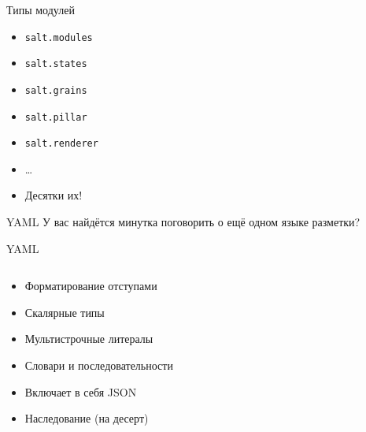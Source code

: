 \begin{Frame}{Типы модулей}
  \begin{itemize}[<+-| alert@ +>]
    \item \texttt{salt.modules}
    \item \texttt{salt.states}
    \item \texttt{salt.grains}
    \item \texttt{salt.pillar}
    \item \texttt{salt.renderer}
    \item \ldots
    \item Десятки их!
  \end{itemize}
\end{Frame}

\begin{Frame}{YAML}
  \centering
  \huge У вас найдётся минутка поговорить о ещё одном языке разметки?
\end{Frame}

\begin{frame}{YAML}
  \ExampleNote{}

  \begin{columns}
    \begin{column}{0.5\textwidth}
      \begin{itemize}[<+-| alert@ +>]
        \item Форматирование отступами
        \item Скалярные типы
        \item Мультистрочные литералы\footnotemark{}
        \item Словари и последовательности
        \item Включает в себя JSON
        \item Наследование (на десерт)
      \end{itemize}
    \end{column}

    \begin{column}{0.5\textwidth}
      \inputminted{yaml}{../examples/yaml-file.yaml}
    \end{column}
  \end{columns}


\end{frame}
